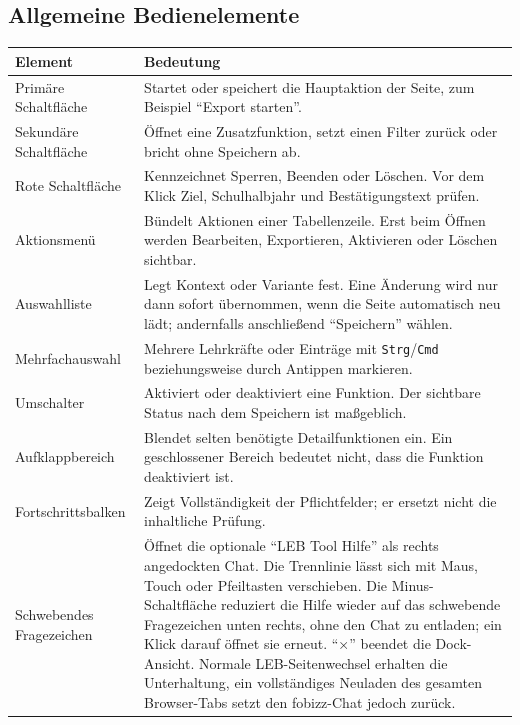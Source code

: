 \documentclass[12pt,a4paper]{article}
\begin{document}
\subsection{Allgemeine Bedienelemente}
\begin{tabularx}{\textwidth}{|p{}|X|}
\hline
\textbf{Element} & \textbf{Bedeutung}\\
\hline
Primäre Schaltfläche & Startet oder speichert die Hauptaktion der Seite, zum Beispiel \enquote{Export starten}.\\
\hline
Sekundäre Schaltfläche & Öffnet eine Zusatzfunktion, setzt einen Filter zurück oder bricht ohne Speichern ab.\\
\hline
Rote Schaltfläche & Kennzeichnet Sperren, Beenden oder Löschen. Vor dem Klick Ziel, Schulhalbjahr und Bestätigungstext prüfen.\\
\hline
Aktionsmenü & Bündelt Aktionen einer Tabellenzeile. Erst beim Öffnen werden Bearbeiten, Exportieren, Aktivieren oder Löschen sichtbar.\\
\hline
Auswahlliste & Legt Kontext oder Variante fest. Eine Änderung wird nur dann sofort übernommen, wenn die Seite automatisch neu lädt; andernfalls anschließend \enquote{Speichern} wählen.\\
\hline
Mehrfachauswahl & Mehrere Lehrkräfte oder Einträge mit \texttt{Strg}/\texttt{Cmd} beziehungsweise durch Antippen markieren.\\
\hline
Umschalter & Aktiviert oder deaktiviert eine Funktion. Der sichtbare Status nach dem Speichern ist maßgeblich.\\
\hline
Aufklappbereich & Blendet selten benötigte Detailfunktionen ein. Ein geschlossener Bereich bedeutet nicht, dass die Funktion deaktiviert ist.\\
\hline
Fortschrittsbalken & Zeigt Vollständigkeit der Pflichtfelder; er ersetzt nicht die inhaltliche Prüfung.\\
\hline
Schwebendes Fragezeichen & Öffnet die optionale \enquote{LEB Tool Hilfe} als rechts angedockten Chat. Die Trennlinie lässt sich mit Maus, Touch oder Pfeiltasten verschieben. Die Minus-Schaltfläche reduziert die Hilfe wieder auf das schwebende Fragezeichen unten rechts, ohne den Chat zu entladen; ein Klick darauf öffnet sie erneut. \enquote{×} beendet die Dock-Ansicht. Normale LEB-Seitenwechsel erhalten die Unterhaltung, ein vollständiges Neuladen des gesamten Browser-Tabs setzt den fobizz-Chat jedoch zurück.\\
\hline
\end{tabularx}
\end{document}
